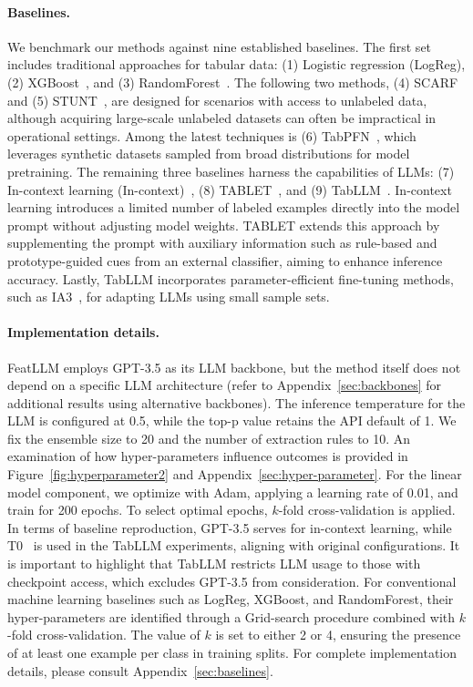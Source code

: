 \vspace*{-0.12in}
\paragraph{Baselines.}
We benchmark our methods against nine established baselines. The first set includes traditional approaches for tabular data: (1) Logistic regression (LogReg), (2) XGBoost~\cite{chen2016xgboost}, and (3) RandomForest~\cite{ho1995random}. The following two methods, (4) SCARF~\cite{bahri2022scarf} and (5) STUNT~\cite{nam2023stunt}, are designed for scenarios with access to unlabeled data, although acquiring large-scale unlabeled datasets can often be impractical in operational settings. Among the latest techniques is (6) TabPFN~\cite{hollmann2022tabpfn}, which leverages synthetic datasets sampled from broad distributions for model pretraining. The remaining three baselines harness the capabilities of LLMs: (7) In-context learning (In-context)~\cite{wei2022emergent}, (8) TABLET~\cite{slack2023tablet}, and (9) TabLLM~\cite{hegselmann2023tabllm}. In-context learning introduces a limited number of labeled examples directly into the model prompt without adjusting model weights. TABLET extends this approach by supplementing the prompt with auxiliary information such as rule-based and prototype-guided cues from an external classifier, aiming to enhance inference accuracy. Lastly, TabLLM incorporates parameter-efficient fine-tuning methods, such as IA3~\cite{liu2022few}, for adapting LLMs using small sample sets.

\vspace*{-0.12in}
\paragraph{Implementation details.}
\textsf{FeatLLM} employs GPT-3.5 as its LLM backbone, but the method itself does not depend on a specific LLM architecture (refer to Appendix~\ref{sec:backbones} for additional results using alternative backbones). The inference temperature for the LLM is configured at 0.5, while the top-p value retains the API default of 1. We fix the ensemble size to 20 and the number of extraction rules to 10. An examination of how hyper-parameters influence outcomes is provided in Figure~\ref{fig:hyperparameter2} and Appendix~\ref{sec:hyper-parameter}. For the linear model component, we optimize with Adam, applying a learning rate of 0.01, and train for 200 epochs. To select optimal epochs, $k$-fold cross-validation is applied. In terms of baseline reproduction, GPT-3.5 serves for in-context learning, while T0~\cite{sanh2022multitask} is used in the TabLLM experiments, aligning with original configurations. It is important to highlight that TabLLM restricts LLM usage to those with checkpoint access, which excludes GPT-3.5 from consideration. For conventional machine learning baselines such as LogReg, XGBoost, and RandomForest, their hyper-parameters are identified through a Grid-search procedure combined with $k$-fold cross-validation. The value of $k$ is set to either 2 or 4, ensuring the presence of at least one example per class in training splits. For complete implementation details, please consult Appendix~\ref{sec:baselines}.

